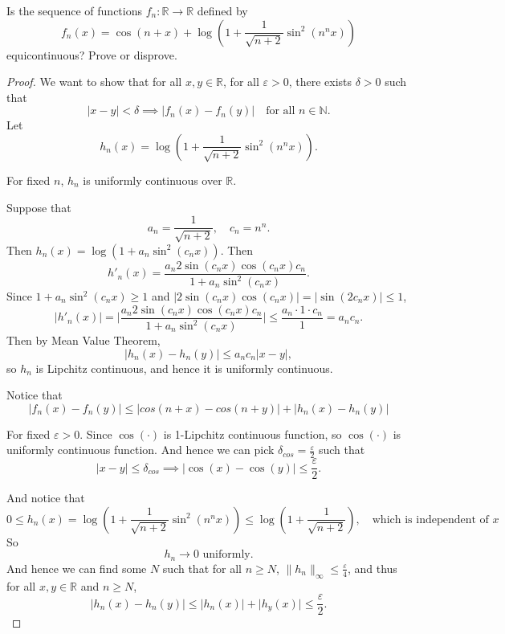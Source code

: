 \begin{problem}
    Is the sequence of functions \(f_n:\mathbb R\to\mathbb R\) defined by
    \[
    f_n(x)
    =
    \cos(n+x)
    +
    \log\left(
    1+\frac{1}{\sqrt{n+2}}\sin^2(n^n x)
    \right)
    \]
    equicontinuous? Prove or disprove.
\end{problem}

\begin{proof}
    We want to show that for all $x, y \in \mathbb{R}$, for all $\varepsilon > 0$, there exists $\delta > 0$ such that
    \[
        \lvert x - y\rvert < \delta \implies \lvert f_n(x) - f_n(y) \rvert \quad \text{for all } n \in \mathbb{N}.
    \]
    Let 
    \[
        h_n(x) = \log\left(
        1+\frac{1}{\sqrt{n+2}}\sin^2(n^n x)
        \right).
    \]

    \begin{claim}
    For fixed $n$, $h_n$ is uniformly continuous over $\mathbb{R}$.
    \end{claim}
    \begin{explanation}
    Suppose that 
    \[
        a_n = \frac{1}{\sqrt{n+2}}, \quad c_n = n^n.
    \]
    Then $h_n(x) = \log\left(1+a_n\sin^2(c_n x)\right)$.
    Then 
    \[
        h'_n(x) = \frac{a_n 2 \sin(c_nx)\cos(c_nx)c_n}{1+a_n\sin^2(c_n x)}.
    \]
    Since $1+a_n\sin^2(c_n x) \ge 1$ and $\vert 2 \sin(c_nx)\cos(c_nx) \vert = \lvert \sin(2c_nx)\rvert \le 1$, 
    \[
        \vert h'_n(x) \vert  = \lvert \frac{a_n 2 \sin(c_nx)\cos(c_nx)c_n}{1+a_n\sin^2(c_n x)} \rvert  \le \frac{a_n \cdot 1 \cdot c_n}{1} = a_n c_n.
    \]
    Then by Mean Value Theorem,
    \[
        \lvert h_n(x) - h_n(y) \rvert \le a_n c_n \lvert x-y \rvert,
    \]
    so $h_n$ is Lipchitz continuous, and hence it is uniformly continuous.
    \end{explanation}

    
    Notice that 
    \[
        \lvert f_n(x) - f_n(y) \rvert \le \lvert cos(n+x) - cos(n+y)\rvert + \lvert h_n(x) - h_n(y)\rvert
    \]

    For fixed $\varepsilon > 0$. Since $\cos(\cdot)$ is 1-Lipchitz continuous function, so $\cos(\cdot)$ is uniformly continuous function. And hence we can pick $\delta_{cos} = \frac{\varepsilon}{2}$ such that 
    \[
        \lvert x - y\rvert \le \delta_{cos} \implies \lvert \cos(x) - \cos(y) \rvert \le \frac{\varepsilon}{2}.
    \]

    And notice that 
    \[
        0 \le h_n(x) = \log\left(
        1+\frac{1}{\sqrt{n+2}}\sin^2(n^n x)
        \right) \le \log\left(
        1+\frac{1}{\sqrt{n+2}}
        \right), \quad \text{which is independent of  } x
    \]
    So
    \[
        h_n \to 0 \text{ uniformly.}
    \]
    And hence we can find some $N$ such that for all $n \ge N$, $\|h_n\|_{\infty} \le \frac{\varepsilon}{4}$, and thus for all $x, y \in \mathbb{R}$ and $n \ge N$,
    \[
        \lvert h_n(x) - h_n(y) \rvert \le \lvert h_n(x) \rvert + \lvert h_y(x) \rvert \le 
        \frac{\varepsilon}{2}.
    \]


\end{proof}
